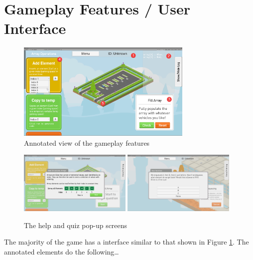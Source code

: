 \documentclass[10pt]{article}
\begin{document}
\section{Gameplay Features / User Interface}
\begin{figure}
  \centering
  \includegraphics[width=0.75\textwidth]{images/annotatedelements.png}
\caption{Annotated view of the gameplay features}
\label{fig:annotatedelements}
\end{figure}
\begin{figure}
  \centering
  \includegraphics[width=0.48\textwidth]{images/help.png}
  \includegraphics[width=0.48\textwidth]{images/quiz.png}
\caption{The help and quiz pop-up screens}
\label{fig:helpquiz}
\end{figure}
The majority of the game has a interface similar to that shown in Figure \ref{fig:annotatedelements}. The annotated elements do the following\dots
\end{document}
